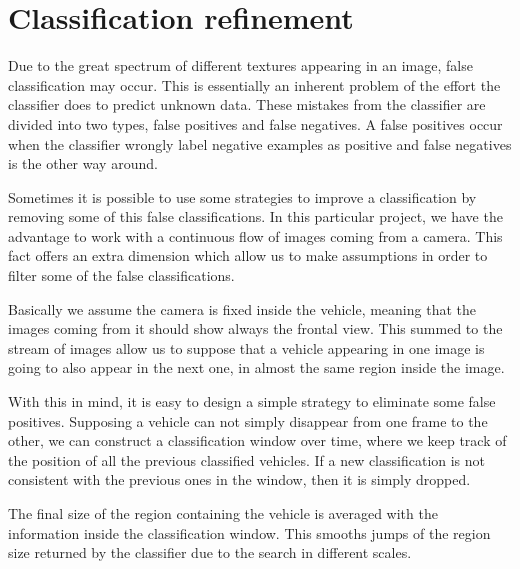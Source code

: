 


\section{Classification refinement} %
\label{sec:Classification-refinement}

Due to the great spectrum of different textures appearing in an image, false
classification may occur. This is essentially an inherent problem of the
effort the classifier does to predict unknown data. These mistakes from the
classifier are divided into two types, false positives and false negatives. A
false positives occur when the classifier wrongly label negative examples as 
positive and false negatives is the other way around.

Sometimes it is possible to use some strategies to improve a classification by
removing some of this false classifications. In this particular project, we have
the advantage to work with a continuous flow of images coming from a camera.
This fact offers an extra dimension which allow us to make assumptions in
order to filter some of the false classifications.

Basically we assume the camera is fixed inside the vehicle, meaning that the images
coming from it should show always the frontal view. This summed to the stream of
images allow us to suppose that a vehicle appearing in one image is going to also 
appear in the next one, in almost the same region inside the image.

With this in mind, it is easy to design a simple strategy to eliminate some
false positives. Supposing a vehicle can not simply disappear from one
frame to the other, we can construct a classification window over time, where we
keep track of the position of all the previous classified vehicles. If a new
classification is not consistent with the previous ones in the window, then it
is simply dropped. 

The final size of the region containing the vehicle is averaged with the
information inside the classification window. This smooths jumps of the region
size returned by the classifier due to the search in different scales.

